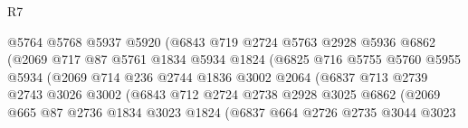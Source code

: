 \begin{lexlean}{R7}
\begin{coremodule}
                                @5764
                                @5768
                                @5937
                                @5920
                                (@6843
                                  @719
                                  @2724
                                  @5763
                                  @2928
                                  @5936
                                  @6862
                                  (@2069
                                    @717
                                    @87
                                    @5761
                                    @1834
                                    @5934
                                    @1824
                                    (@6825
                                      @716
                                      @5755
                                      @5760
                                      @5955
                                      @5934
                                      (@2069
                                        @714
                                        @236
                                        @2744
                                        @1836
                                        @3002
                                        @2064
                                        (@6837
                                          @713
                                          @2739
                                          @2743
                                          @3026
                                          @3002
                                          (@6843
                                            @712
                                            @2724
                                            @2738
                                            @2928
                                            @3025
                                            @6862
                                            (@2069
                                              @665
                                              @87
                                              @2736
                                              @1834
                                              @3023
                                              @1824
                                              (@6837
                                                @664
                                                @2726
                                                @2735
                                                @3044
                                                @3023

\end{coremodule}
\end{lexlean}
